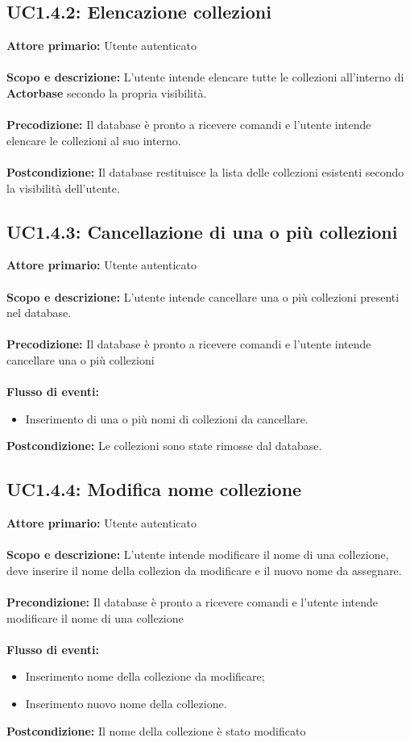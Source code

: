 \documentclass{scalatekids-article}
\begin{document}
\subsection{UC1.4.2: Elencazione collezioni}
\textbf{Attore primario:} Utente autenticato\\ \\
\textbf{Scopo e descrizione:} L'utente intende elencare tutte le collezioni all'interno di \textbf{Actorbase} secondo la propria visibilità.\\ \\
\textbf{Precodizione:} Il database è pronto a ricevere comandi e l'utente intende elencare le collezioni al suo interno.\\ \\
\textbf{Postcondizione:} Il database restituisce la lista delle collezioni esistenti secondo la visibilità dell'utente.
\subsection{UC1.4.3: Cancellazione di una o più collezioni}
\textbf{Attore primario:} Utente autenticato\\ \\
\textbf{Scopo e descrizione:} L’utente intende cancellare una o più collezioni presenti nel database.\\ \\
\textbf{Precodizione:} Il database è pronto a ricevere comandi e l’utente intende cancellare una o più collezioni\\ \\
\textbf{Flusso di eventi:}
\begin{itemize}
\item Inserimento di una o più nomi di collezioni da cancellare.
\end{itemize}
\textbf{Postcondizione:} Le collezioni sono state rimosse dal database.
\subsection{UC1.4.4: Modifica nome collezione}
\textbf{Attore primario:} Utente autenticato \\ \\
\textbf{Scopo e descrizione:} L’utente intende modificare il nome di una collezione, deve inserire il nome della collezion da modificare e il nuovo nome da assegnare. \\ \\
\textbf{Precondizione:} Il database è pronto a ricevere comandi e l’utente intende modificare il nome di una collezione\\ \\
\textbf{Flusso di eventi:}
\begin{itemize}
\item Inserimento nome della collezione da modificare;
\item Inserimento nuovo nome della collezione.
\end{itemize}
\textbf{Postcondizione:} Il nome della collezione è stato modificato
\end{document}
